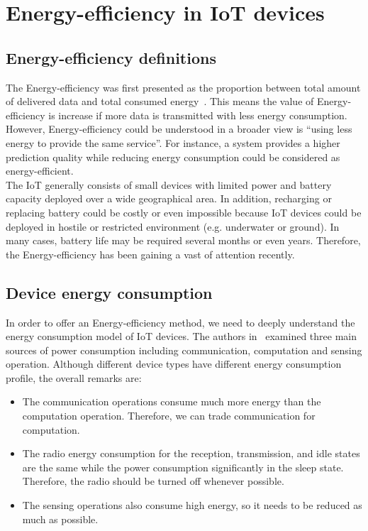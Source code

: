 
\section{Energy-efficiency in IoT devices}

\subsection{Energy-efficiency definitions}

The Energy-efficiency was first presented as the proportion between total amount of delivered data and total consumed energy~\cite{dietrich2009lifetime}. This means the value of Energy-efficiency is increase if more data is transmitted with less energy consumption. However, Energy-efficiency could be understood in a broader view is ``using less energy to provide the same service''. For instance, a system provides a higher prediction quality while reducing energy consumption could be considered as energy-efficient.\\

The IoT generally consists of small devices with limited power and battery capacity deployed over a wide geographical area. In addition, recharging or replacing battery could be costly or even impossible because IoT devices could be deployed in hostile or restricted environment (e.g. underwater or ground). In many cases, battery life may be required several months or even years. Therefore, the Energy-efficiency has been gaining a vast of attention recently.

\subsection{Device energy consumption}
In order to offer an  Energy-efficiency method, we need to deeply understand the energy consumption model of IoT devices. The authors in~\cite{anastasi2009energy} examined three main sources of power consumption including communication, computation and sensing operation. Although different device types have different energy consumption profile, the overall remarks are:

\begin{itemize}

    \item The communication operations consume much more energy than the computation operation. Therefore, we can trade communication for computation.
    
    \item The radio energy consumption for the reception, transmission, and idle states are the same while the power consumption significantly in the sleep state. Therefore, the radio should be turned off whenever possible.
    
    \item The sensing operations also consume high energy, so it needs to be reduced as much as possible.
    
\end{itemize}

